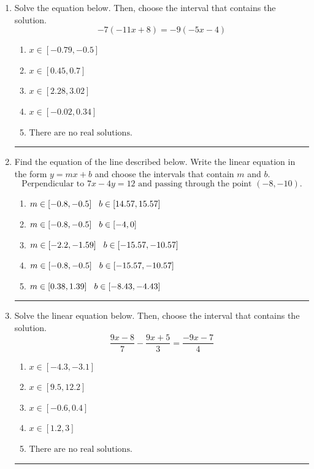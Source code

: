\documentclass[14pt]{extbook}
\newcommand{\litem}[1]{\item#1\hspace*{-1cm}\rule{\textwidth}{0.4pt}}
\begin{document}
\begin{enumerate}
{\begin{enumerate}[label=\Alph*.]
\end{enumerate} }
\litem{
Solve the equation below. Then, choose the interval that contains the solution.\[ -7(-11x + 8) = -9(-5x -4) \]\begin{enumerate}[label=\Alph*.]
\item \( x \in [-0.79, -0.5] \)
\item \( x \in [0.45, 0.7] \)
\item \( x \in [2.28, 3.02] \)
\item \( x \in [-0.02, 0.34] \)
\item \( \text{There are no real solutions.} \)

\end{enumerate} }
\litem{
Find the equation of the line described below. Write the linear equation in the form $ y=mx+b $ and choose the intervals that contain $m$ and $b$.\[ \text{Perpendicular to } 7 x - 4 y = 12 \text{ and passing through the point } (-8, -10). \]\begin{enumerate}[label=\Alph*.]
\item \( m \in [-0.8, -0.5] \hspace*{3mm} b \in [14.57, 15.57] \)
\item \( m \in [-0.8, -0.5] \hspace*{3mm} b \in [-4, 0] \)
\item \( m \in [-2.2, -1.59] \hspace*{3mm} b \in [-15.57, -10.57] \)
\item \( m \in [-0.8, -0.5] \hspace*{3mm} b \in [-15.57, -10.57] \)
\item \( m \in [0.38, 1.39] \hspace*{3mm} b \in [-8.43, -4.43] \)

\end{enumerate} }
\litem{
Solve the linear equation below. Then, choose the interval that contains the solution.\[ \frac{9x -8}{7} - \frac{9x + 5}{3} = \frac{-9x -7}{4} \]\begin{enumerate}[label=\Alph*.]
\item \( x \in [-4.3, -3.1] \)
\item \( x \in [9.5, 12.2] \)
\item \( x \in [-0.6, 0.4] \)
\item \( x \in [1.2, 3] \)
\item \( \text{There are no real solutions.} \)


\end{enumerate}}
\end{enumerate}
\end{document}
